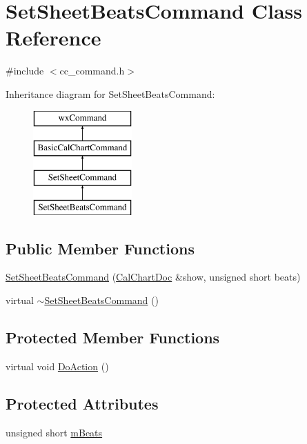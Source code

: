 \hypertarget{a00133}{\section{Set\-Sheet\-Beats\-Command Class Reference}
\label{a00133}
}


{\ttfamily \#include $<$cc\-\_\-command.\-h$>$}

Inheritance diagram for Set\-Sheet\-Beats\-Command\-:\begin{figure}[H]
\begin{center}
\leavevmode
\includegraphics[height=4.000000cm]{a00133}
\end{center}
\end{figure}
\subsection*{Public Member Functions}
\begin{DoxyCompactItemize}
\item 
\hyperlink{a00133_a0cd2970a9b359824174deceb61a0667d}{Set\-Sheet\-Beats\-Command} (\hyperlink{a00020}{Cal\-Chart\-Doc} \&show, unsigned short beats)
\item 
virtual \hyperlink{a00133_a402bd383feaebc1e9df227b825b39b06}{$\sim$\-Set\-Sheet\-Beats\-Command} ()
\end{DoxyCompactItemize}
\subsection*{Protected Member Functions}
\begin{DoxyCompactItemize}
\item 
virtual void \hyperlink{a00133_a9efb63e15dae7c253792ae214feda42e}{Do\-Action} ()
\end{DoxyCompactItemize}
\subsection*{Protected Attributes}
\begin{DoxyCompactItemize}
\item 
unsigned short \hyperlink{a00133_a250b3521cf446900d626a1d6a02a5ec6}{m\-Beats}
\end{DoxyCompactItemize}


